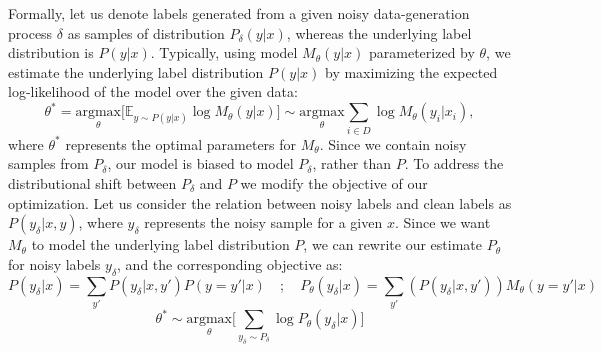 Formally, let us denote labels generated from a given noisy data-generation process $\delta$ as samples of distribution $P_{\delta}(y|x)$, whereas the underlying label distribution is $P(y|x)$.
Typically, using model $M_{\theta}(y|x)$ parameterized by $\theta$, we estimate the underlying label distribution $P(y|x)$ by maximizing the expected log-likelihood of the model over the given data:
\begin{equation}
   \theta^{*} =  \underset{\theta}{\mathrm{argmax}} \big[ \mathbb{E}_{y\sim P(y|x)}\log M_{\theta}(y|x) \big] \sim  \underset{\theta}{\mathrm{argmax}} \sum_{i \in D}{\log M_\theta(y_i|x_i)},
\end{equation}
where $\theta^{*}$ represents the optimal parameters for $M_\theta$. Since we contain noisy samples from $P_{\delta}$, our model is biased to model $P_{\delta}$, rather than $P$. To address the distributional shift between $P_\delta$ and $P$ we modify the objective of our optimization. 
Let us consider the relation between noisy labels and clean labels as $P(y_\delta|x,y)$, where $y_\delta$ represents the noisy sample for a given $x$. Since we want $M_\theta$ to model the underlying label distribution $P$, we can rewrite our estimate $P_\theta$ for noisy labels $y_\delta$, and the corresponding objective as:
\begin{equation}
    P(y_\delta|x) = \sum_{y'}P(y_\delta | x, y')P(y=y'|x) \quad ; \quad P_\theta(y_\delta|x) = \sum_{y'}(P(y_\delta | x, y'))M_\theta(y=y'|x)
\label{eq:noisy distribution}
\end{equation}
\begin{equation}
   \theta^{*} \sim  \underset{\theta}{\mathrm{argmax}} \big[ \sum_{y_\delta \sim P_\delta}{\log P_\theta(y_\delta | x)} \big]
   \label{eq_new_object}
\end{equation}

